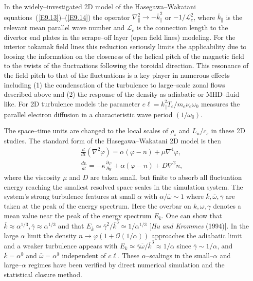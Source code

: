\documentclass[a4paper,openany,12pt]{book}
\begin{document}
In the widely--investigated 2D model of the Hasegawa--Wakatani equations~(\ref{E9.13})--(\ref{E9.14}) the operator $\nabla_\|^2\to-\overline k_\|^2$ or $-1/\mathcal{L}_c^2$, where $\overline k_\|$ is the relevant mean parallel wave number and $\mathcal{L}_c$ is the connection length to the divertor end plates in the scrape--off layer (open field lines) modeling. For the interior tokamak field lines this reduction seriously limits the applicability due to loosing the information on the closeness of the helical pitch of the magnetic field to the twists of the fluctuations following the toroidal direction. This resonance of the field pitch to that of the fluctuations is a key player in numerous effects including (1) the condensation of the turbulence to large--scale zonal flows described above and (2) the response of the density as adiabatic or MHD--fluid like. For 2D turbulence models the parameter $c\ell=k_\|^2T_e/m_e\nu_e\omega_0$ measures the parallel electron diffusion in a characteristic wave period $(1/\omega_0)$.

The space--time units are changed to the local scales of $\rho_s$ and $L_n/c_s$ in these 2D studies. The standard form of the Hasegawa--Wakatani 2D model is then
\begin{eqnarray}
&&\frac{d}{dt}(\nabla^2\varphi) = \alpha(\varphi-n)+\mu\nabla^4\varphi,\label{E9.15}\\
&&\frac{dn}{dt} = -\kappa\frac{\partial\varphi}{\partial y}+\alpha(\varphi-n)+D\nabla^2n, \label{E9.16}
\end{eqnarray}
where the viscosity $\mu$ and $D$ are taken small, but finite to absorb all fluctuation energy reaching the smallest resolved space scales in the simulation system. The system's strong turbulence features at small 
$\alpha$ with $\alpha/\overline\omega\sim 1$ where $\overline k, \overline\omega, \overline\gamma$ are taken at the peak of the energy spectrum. Here the overbar on $k, \omega, \gamma$ denotes a mean value near the peak of the energy spectrum $E_k$. One can show that $\overline k\approx\alpha^{1/3}, \overline\gamma\approx\alpha^{1/3}$ and that $E_{\overline k}\simeq\overline\gamma^2/\overline k^3\simeq 1/\alpha^{1/3}$ [\emph{Hu and Krommes} (1994)]. In the large $\alpha$ limit the density $n\to\varphi(1+\mathcal{O}(1/\alpha))$ approaches the adiabatic limit and a weaker turbulence appears with $ E_k\simeq\overline\gamma\overline\omega/\overline k^3\approx 1/\alpha$ since $\overline\gamma\sim 1/\alpha$, and $\overline k=\alpha^0$ and $\overline\omega = \alpha^0$ independent of $c\ell$. These 
$\alpha$--scalings in the small--$\alpha$ and large--$\alpha$ regimes have been verified by direct numerical simulation and the statistical closure method.
\end{document}
